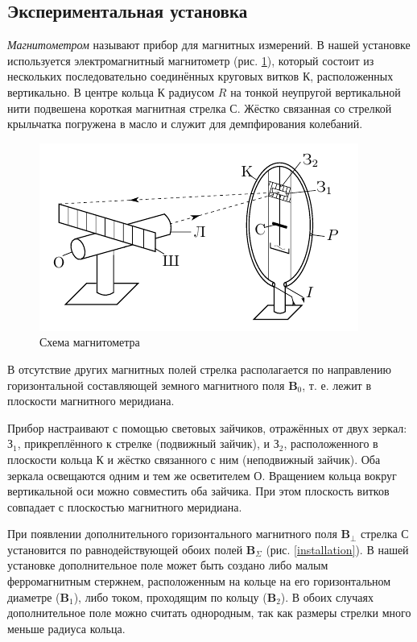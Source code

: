 \documentclass[a4paper, 12pt]{article}
\begin{document}
    \subsection{Экспериментальная установка}

    \textit{Магнитометром} называют прибор для магнитных измерений. В нашей установке используется электромагнитный магнитометр (рис. \ref{magnetometer}), который состоит из нескольких последовательно соединённых круговых витков К, расположенных вертикально. В центре кольца К радиусом $R$ на тонкой неупругой вертикальной нити подвешена короткая магнитная стрелка С. Жёстко связанная со стрелкой крыльчатка погружена в масло и служит для демпфирования колебаний.

    \begin{figure}[H]
        \centering
        \includegraphics{images/magnetometer.png}
        \caption{Схема магнитометра}
        \label{magnetometer}
    \end{figure}

    В отсутствие других магнитных полей стрелка располагается по направлению горизонтальной составляющей земного магнитного поля $\bm{B}_0$, т. е. лежит в плоскости магнитного меридиана.

    Прибор настраивают с помощью световых зайчиков, отражённых от двух зеркал: $\text{З}_1$, прикреплённого к стрелке (подвижный зайчик), и $\text{З}_2$, расположенного в плоскости кольца К и жёстко связанного с ним (неподвижный зайчик). Оба зеркала освещаются одним и тем же осветителем О. Вращением кольца вокруг вертикальной оси можно совместить оба зайчика. При этом плоскость витков совпадает с плоскостью магнитного меридиана.
    
    При появлении дополнительного горизонтального магнитного поля $\bm{B}_\perp$ стрелка С установится по равнодействующей обоих полей $\bm{B}_\Sigma$ (рис. \ref{installation}). В нашей установке дополнительное поле может быть создано либо малым ферромагнитным стержнем, расположенным на кольце на его горизонтальном диаметре ($\bm{B}_1$), либо током, проходящим по кольцу ($\bm{B}_2$). В обоих случаях дополнительное поле можно считать однородным, так как размеры стрелки много меньше радиуса кольца.
    
\end{document}
